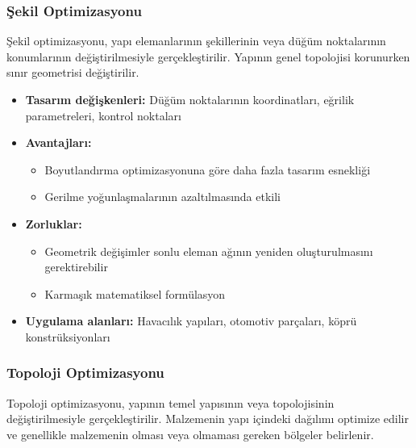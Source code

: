 \subsubsection{Şekil Optimizasyonu}
Şekil optimizasyonu, yapı elemanlarının şekillerinin veya düğüm noktalarının konumlarının değiştirilmesiyle gerçekleştirilir. Yapının genel topolojisi korunurken sınır geometrisi değiştirilir.

\begin{itemize}
    \item \textbf{Tasarım değişkenleri:} Düğüm noktalarının koordinatları, eğrilik parametreleri, kontrol noktaları
    \item \textbf{Avantajları:} 
    \begin{itemize}
        \item Boyutlandırma optimizasyonuna göre daha fazla tasarım esnekliği
        \item Gerilme yoğunlaşmalarının azaltılmasında etkili
    \end{itemize}
    \item \textbf{Zorluklar:} 
    \begin{itemize}
        \item Geometrik değişimler sonlu eleman ağının yeniden oluşturulmasını gerektirebilir
        \item Karmaşık matematiksel formülasyon
    \end{itemize}
    \item \textbf{Uygulama alanları:} Havacılık yapıları, otomotiv parçaları, köprü konstrüksiyonları
\end{itemize}

\subsubsection{Topoloji Optimizasyonu}
Topoloji optimizasyonu, yapının temel yapısının veya topolojisinin değiştirilmesiyle gerçekleştirilir. Malzemenin yapı içindeki dağılımı optimize edilir ve genellikle malzemenin olması veya olmaması gereken bölgeler belirlenir.

